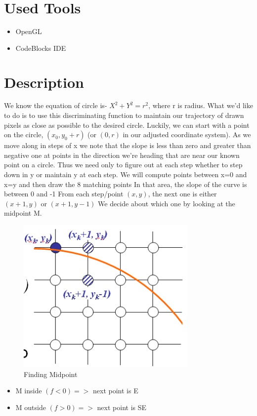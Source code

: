 \documentclass[11pt]{report}
\begin{document}
\section{Used Tools}
\begin{itemize}
	\item OpenGL
	\item CodeBlocks IDE
\end{itemize}

\section{Description}
We know the equation of circle is-
$ X^2+Y^2=r^2 $, where r is radius.
What we'd like to do is to use this discriminating function to maintain our trajectory of drawn pixels as close as possible to the desired circle. Luckily, we can start with a point on the circle, $(x_0, y_0 + r)$ (or $(0, r)$ in our adjusted coordinate system). As we move along in steps of x we note that the slope is less than zero and greater than negative one at points in the direction we're heading that are near our known point on a circle. Thus we need only to figure out at each step whether to step down in y or maintain y at each step.
\newline
We will compute points between x=0 and x=y and then draw the 8 matching points In that area, the slope of the curve is between 0 and -1
From each step/point $(x, y)$, the next one is either $(x+1, y)$ or $(x+1, y-1)$
We decide about which one by looking at the midpoint M.
\begin{figure}[h]
	\centering
	\includegraphics[height=3.0in]{b_circle1}
	\caption{Finding Midpoint}	
\end{figure}

\begin{itemize}
	\item  M inside $(f<0) =>$ next point is E
	\item M outside $(f>0) =>$ next point is SE
\end{itemize}
\end{document}

